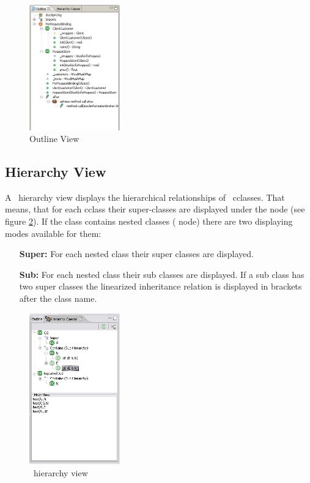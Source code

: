 \begin{figure}[htbp]
	\centering
		\includegraphics[width=0.35\textwidth]{images/outline.png}
	\caption{Outline View}
	\label{fig:outline_view}
\end{figure}

\subsection{Hierarchy View\label{hierarchyview}}
A \caesarj ~hierarchy view displays the hierarchical relationships of \caesarj ~cclasses. That means, that for each cclass their super-classes are displayed under the  node (see figure \ref{fig:hierarchy_view}). If the class contains nested classes ( node) there are two displaying modes available for them:
\begin{itemize}
	\item[\textbf{Super:}] For each nested class their super classes are displayed.
	\item[\textbf{Sub:}] For each nested class their sub classes are displayed. If a sub class has two super classes the linearized inheritance relation is displayed in brackets after the class name.
\end{itemize}

\begin{figure}[htbp]
	\centering
		\includegraphics[width=0.35\textwidth]{images/hierarchy.png}
	\caption{\caesarj ~hierarchy view}
	\label{fig:hierarchy_view}
\end{figure}


